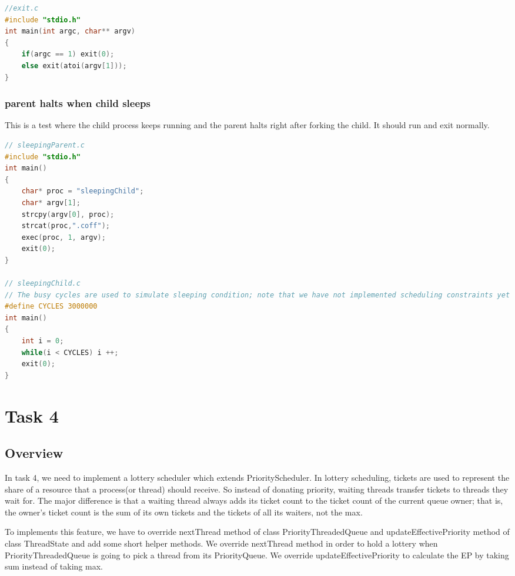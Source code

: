 \documentclass{article}
\begin{document}
\begin{spacing}{1.1}
\begin{lstlisting}[language=C]
//exit.c
#include "stdio.h"
int main(int argc, char** argv)
{
    if(argc == 1) exit(0);
    else exit(atoi(argv[1]));
}
\end{lstlisting}

\subsubsection{parent halts when child sleeps}
This is a test where the child process keeps running and the parent halts right after forking the child. It should run and exit normally.
\begin{lstlisting}[language=C]
// sleepingParent.c
#include "stdio.h"
int main()
{
    char* proc = "sleepingChild";
    char* argv[1];
    strcpy(argv[0], proc);
    strcat(proc,".coff");
    exec(proc, 1, argv);
    exit(0);
}

// sleepingChild.c
// The busy cycles are used to simulate sleeping condition; note that we have not implemented scheduling constraints yet
#define CYCLES 3000000
int main()
{
    int i = 0;
    while(i < CYCLES) i ++;
    exit(0);
}
\end{lstlisting}

\section{Task 4}

\subsection{Overview}
In task 4, we need to implement a lottery scheduler which extends \textsf{PriorityScheduler}. In lottery scheduling, tickets are used to represent the share of a resource that a process(or thread) should receive. So instead of donating priority, waiting threads transfer tickets to threads they wait for. The major difference is that a waiting thread always adds its ticket count to the ticket count of the current queue owner; that is, the owner's ticket count is the sum of its own tickets and the tickets of all its waiters, not the max.

To implements this feature, we have to override \textsf{nextThread} method of class \textsf{PriorityThreadedQueue} and \textsf{updateEffectivePriority} method of class \textsf{ThreadState} and add some short helper methods. We override \textsf{nextThread} method in order to hold a lottery when \textsf{PriorityThreadedQueue} is going to pick a thread from its \textsf{PriorityQueue}. We override \textsf{updateEffectivePriority} to calculate the EP by taking sum instead of taking max.


\end{spacing}
\end{document}
